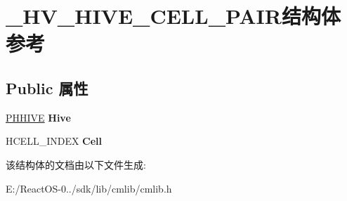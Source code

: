\hypertarget{struct___h_v___h_i_v_e___c_e_l_l___p_a_i_r}{}\section{\+\_\+\+H\+V\+\_\+\+H\+I\+V\+E\+\_\+\+C\+E\+L\+L\+\_\+\+P\+A\+I\+R结构体 参考}
\label{struct___h_v___h_i_v_e___c_e_l_l___p_a_i_r}
\subsection*{Public 属性}
\begin{DoxyCompactItemize}
\item 
\mbox{\label{struct___h_v___h_i_v_e___c_e_l_l___p_a_i_r_adc8e802fbe8ba604e162b02ee5a09784}} 
\hyperlink{struct___h_h_i_v_e}{P\+H\+H\+I\+VE} {\bfseries Hive}
\item 
\mbox{\label{struct___h_v___h_i_v_e___c_e_l_l___p_a_i_r_a59bfb899aa448b97f1b19105d402d6b0}} 
H\+C\+E\+L\+L\+\_\+\+I\+N\+D\+EX {\bfseries Cell}
\end{DoxyCompactItemize}


该结构体的文档由以下文件生成\+:\begin{DoxyCompactItemize}
\item 
E\+:/\+React\+O\+S-\/0../sdk/lib/cmlib/cmlib.\+h\end{DoxyCompactItemize}
